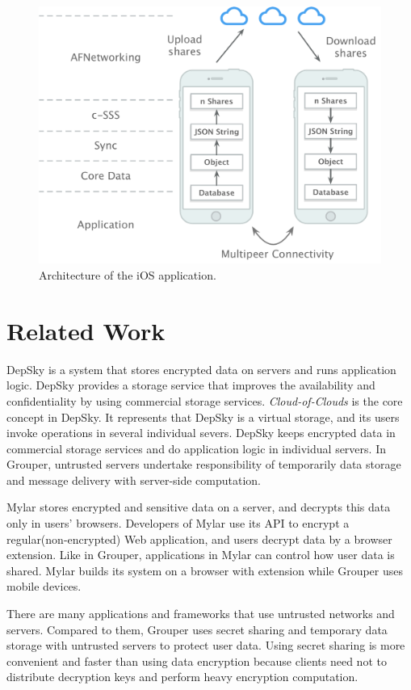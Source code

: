 \documentclass[twocolumn,10pt]{article}
\begin{document}
 \begin{figure}[t]
	\centering
	\includegraphics[scale=0.35]{architecture}
	\caption{Architecture of the iOS application.}
\end{figure}

\section{Related Work}

DepSky\cite{bessani2013depsky} is a system that stores encrypted data on servers and runs application logic. DepSky provides a storage service that improves the availability and confidentiality by using commercial storage services. \emph{Cloud-of-Clouds} is the core concept in DepSky. It represents that DepSky is a virtual storage, and its users invoke operations in several individual severs. DepSky keeps encrypted data in commercial storage services and do application logic in individual servers. In Grouper,  untrusted servers undertake responsibility of temporarily data storage and message delivery with server-side computation.

Mylar\cite{popa2014building} stores encrypted and sensitive data on a server, and decrypts this data only in users’ browsers. Developers of Mylar use its API to encrypt a regular(non-encrypted) Web application, and users decrypt data by a browser extension. Like in Grouper, applications in Mylar can control how user data is shared. Mylar builds its system on a browser with extension while Grouper uses mobile devices.

There are many applications and frameworks that use untrusted networks and servers. Compared to them, Grouper uses secret sharing and temporary data storage with untrusted servers to protect user data. Using secret sharing is more convenient and faster than using data encryption because clients need not to distribute decryption keys and perform heavy encryption computation.
\end{document}
